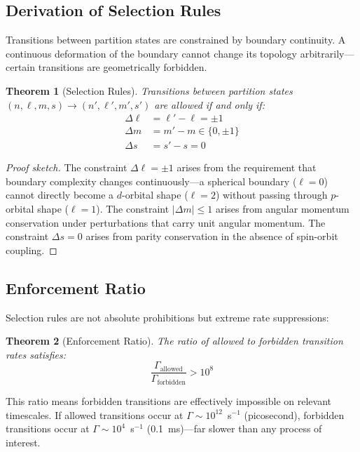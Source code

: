 \documentclass[twocolumn,aps,prx,superscriptaddress,longbibliography]{revtex4-2}
\newtheorem{theorem}{Theorem}[section]
\theoremstyle{remark}
\begin{document}
\subsection{Derivation of Selection Rules}

Transitions between partition states are constrained by boundary continuity.
A continuous deformation of the boundary cannot change its topology
arbitrarily---certain transitions are geometrically forbidden.

\begin{theorem}[Selection Rules]
\label{thm:selection}
Transitions between partition states $(n, \ell, m, s) \to (n', \ell', m', s')$
are allowed if and only if:
\begin{align}
\Delta \ell &= \ell' - \ell = \pm 1 \label{eq:sel_l} \\
\Delta m &= m' - m \in \{0, \pm 1\} \label{eq:sel_m} \\
\Delta s &= s' - s = 0 \label{eq:sel_s}
\end{align}
\end{theorem}

\begin{proof}[Proof sketch]
The constraint $\Delta \ell = \pm 1$ arises from the requirement that
boundary complexity changes continuously---a spherical boundary ($\ell=0$)
cannot directly become a $d$-orbital shape ($\ell=2$) without passing
through $p$-orbital shape ($\ell=1$). The constraint $|\Delta m| \leq 1$
arises from angular momentum conservation under perturbations that carry
unit angular momentum. The constraint $\Delta s = 0$ arises from parity
conservation in the absence of spin-orbit coupling.
\end{proof}

\subsection{Enforcement Ratio}

Selection rules are not absolute prohibitions but extreme rate suppressions:

\begin{theorem}[Enforcement Ratio]
\label{thm:enforcement}
The ratio of allowed to forbidden transition rates satisfies:
\begin{equation}
\frac{\Gamma_\text{allowed}}{\Gamma_\text{forbidden}} > 10^8
\label{eq:enforcement}
\end{equation}
\end{theorem}

This ratio means forbidden transitions are effectively impossible on
relevant timescales. If allowed transitions occur at $\Gamma \sim 10^{12}$~s$^{-1}$
(picosecond), forbidden transitions occur at $\Gamma \sim 10^{4}$~s$^{-1}$
(0.1~ms)---far slower than any process of interest.
\end{document}
